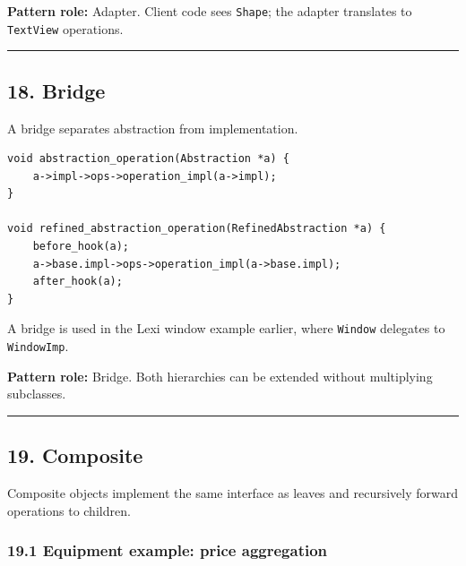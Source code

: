 \documentclass[11pt]{article}
\begin{document}
\textbf{Pattern role:} Adapter. Client code sees \texttt{Shape}; the adapter translates to \texttt{TextView} operations.

\begin{center}\rule{0.5\linewidth}{0.5pt}\end{center}

\subsection{18. Bridge}\label{bridge}

A bridge separates abstraction from implementation.

\begin{verbatim}
void abstraction_operation(Abstraction *a) {
    a->impl->ops->operation_impl(a->impl);
}

void refined_abstraction_operation(RefinedAbstraction *a) {
    before_hook(a);
    a->base.impl->ops->operation_impl(a->base.impl);
    after_hook(a);
}
\end{verbatim}

A bridge is used in the Lexi window example earlier, where \texttt{Window} delegates to \texttt{WindowImp}.

\textbf{Pattern role:} Bridge. Both hierarchies can be extended without multiplying subclasses.

\begin{center}\rule{0.5\linewidth}{0.5pt}\end{center}

\subsection{19. Composite}\label{composite}

Composite objects implement the same interface as leaves and recursively forward operations to children.

\subsubsection{19.1 Equipment example: price aggregation}\label{equipment-example-price-aggregation}
\end{document}
